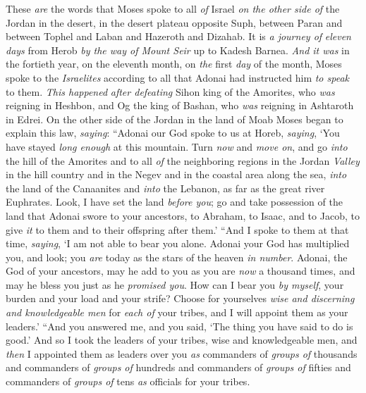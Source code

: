 
\begin{biblechapter} %
 These \textit{are} the words that Moses spoke to all \textit{of} Israel \textit{on the other side of} the Jordan in the desert, in the desert plateau opposite Suph, between Paran and between Tophel and Laban and Hazeroth and Dizahab.
\verse It is \textit{a journey of} \textit{eleven days} from Herob \textit{by the way of Mount Seir} up to Kadesh Barnea.
\verse \textit{And it was} in the fortieth year, on the eleventh month, on \textit{the} first \textit{day} of the month, Moses spoke to the \textit{Israelites} according to all that Adonai had instructed him \textit{to speak} to them.
\verse \textit{This happened} \textit{after defeating} Sihon king of the Amorites, who \textit{was} reigning in Heshbon, and Og the king of Bashan, who \textit{was} reigning in Ashtaroth in Edrei.
\verse On the other side of  the Jordan in the land of Moab Moses began to explain this law, \textit{saying}:
 “Adonai our God spoke to us at Horeb, \textit{saying}, ‘You have stayed \textit{long enough} at this mountain.
\verse Turn \textit{now} and \textit{move on}, and go \textit{into} the hill of the Amorites and to all \textit{of} the neighboring regions in the Jordan \textit{Valley} in the hill country and in the Negev and in the coastal area along the sea, \textit{into} the land of the Canaanites and \textit{into} the Lebanon, as far as the great river Euphrates.
\verse Look, I have set the land \textit{before you}; go and take possession of the land that Adonai swore to your ancestors, to Abraham, to Isaac, and to Jacob, to give \textit{it} to them and to their offspring after them.’
\verse “And I spoke to them at that time, \textit{saying}, ‘I am not able to bear you alone.
\verse Adonai your God has multiplied you, and look; you \textit{are} today as the stars of the heaven \textit{in number}.
\verse Adonai, the God of your ancestors, may he add to you as you are \textit{now} a thousand times, and may he bless you just as he \textit{promised you}.
\verse How can I bear you \textit{by myself}, your burden and your load and your strife?
\verse Choose for yourselves \textit{wise and discerning and knowledgeable men} for \textit{each of} your tribes, and I will appoint them as your leaders.’
\verse “And you answered me, and you said, ‘The thing you have said to do is good.’
\verse And so I took the leaders of your tribes, wise and knowledgeable men, and \textit{then} I appointed them as leaders over you \textit{as} commanders of \textit{groups of} thousands and commanders of \textit{groups of} hundreds and commanders of \textit{groups of} fifties and commanders of \textit{groups of} tens \textit{as} officials for your tribes.

\end{biblechapter}
